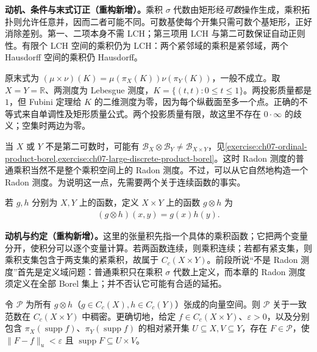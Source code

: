 \documentclass[../../main.tex]{subfiles}
\begin{document}
\begin{remark}
\textbf{动机、条件与末式订正（重构新增）。}乘积 $\sigma$ 代数由矩形经\emph{可数}操作生成，乘积拓扑则允许任意并，因而二者可能不同。可数基使每个开集只需可数个基矩形，正好消除差别。第一、二项本身不需 LCH；第三项用 LCH 与第二可数保证自动正则性。有限个 LCH 空间的乘积仍为 LCH：两个紧邻域的乘积是紧邻域，两个 Hausdorff 空间的乘积仍 Hausdorff。

原末式为 $(\mu\times\nu)(K)=\mu(\pi_X(K))\nu(\pi_Y(K))$，一般不成立。取 $X=Y=\mathbb R$、两测度为 Lebesgue 测度，$K=\{(t,t):0\leqslant t\leqslant1\}$。两投影质量都是 $1$，但 Fubini 定理给 $K$ 的二维测度为零，因为每个纵截面至多一个点。正确的不等式来自单调性及矩形质量公式。两个投影质量有限，故这里不存在 $0\cdot\infty$ 的歧义；空集时两边为零。
\end{remark}
当 $X$ 或 $Y$ 不是第二可数时，可能有 $\mathscr B_X\otimes\mathscr B_Y\ne\mathscr B_{X\times Y}$，见\cref{exercise:ch07-ordinal-product-borel,exercise:ch07-large-discrete-product-borel}。这时 Radon 测度的普通乘积当然不是整个乘积空间上的 Radon 测度。不过，可以从它自然地构造一个 Radon 测度。为说明这一点，先需要两个关于连续函数的事实。
\begin{definition}[函数的张量积]\label{definition:ch07-tensor-functions}
若 $g,h$ 分别为 $X,Y$ 上的函数，定义 $X\times Y$ 上的函数 $g\otimes h$ 为
\begin{align*}
(g\otimes h)(x,y)=g(x)h(y).
\end{align*}
\end{definition}
\begin{remark}
\textbf{动机与约定（重构新增）。}这里的张量积先指一个具体的乘积函数；它把两个变量分开，使积分可以逐个变量计算。若两函数连续，则乘积连续；若都有紧支集，则乘积支集包含于两支集的紧乘积，故属于 $C_c(X\times Y)$。前段所说“不是 Radon 测度”首先是定义域问题：普通乘积只在乘积 $\sigma$ 代数上定义，而本章的 Radon 测度须定义在全部 Borel 集上；并不否认它可能有合适的延拓。
\end{remark}
\begin{proposition}\label{proposition:ch07-tensor-density}
令 $\mathcal P$ 为所有 $g\otimes h$（$g\in C_c(X),h\in C_c(Y)$）张成的向量空间。则 $\mathcal P$ 关于一致范数在 $C_c(X\times Y)$ 中稠密。更确切地，给定 $f\in C_c(X\times Y)$、$\varepsilon>0$，以及分别包含 $\pi_X(\operatorname{supp}f)$、$\pi_Y(\operatorname{supp}f)$ 的相对紧开集 $U\subseteq X,V\subseteq Y$，存在 $F\in\mathcal P$，使 $\|F-f\|_u<\varepsilon$ 且 $\operatorname{supp}F\subseteq U\times V$。
\end{proposition}
\end{document}
